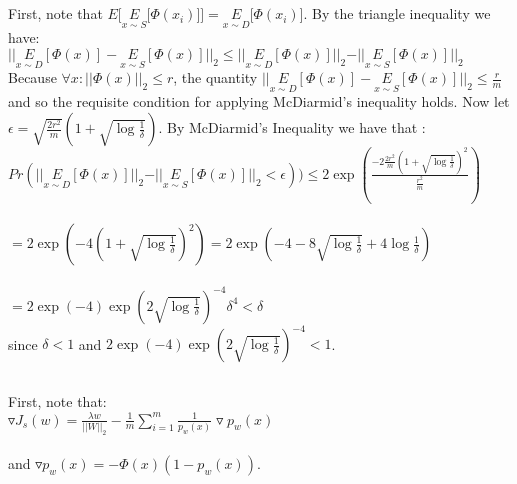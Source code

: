 \documentclass[]{article}
\begin{document}
\pagebreak

\section{}
\subsection{}

First, note that $E\lbrack \underset{x \sim S}{E}\lbrack \Phi(x_i) \rbrack \rbrack = \underset{x \sim D}{E}\lbrack \Phi(x_i) \rbrack$. By the triangle inequality we have:\\

$\vert \vert \underset{x \sim D}{E}[\Phi(x)] - \underset{x \sim S}{E}[\Phi(x)]\vert \vert_2 \le \vert \vert \underset{x \sim D}{E}[\Phi(x)]\vert \vert_2 - \vert \vert \underset{x \sim S}{E}[\Phi(x)]\vert \vert_2$\\

\noindent Because $\forall x: \vert \vert\Phi(x)\vert \vert_2 \le r$, the quantity $\vert \vert \underset{x \sim D}{E}[\Phi(x)] - \underset{x \sim S}{E}[\Phi(x)]\vert \vert_2 \le \frac{r}{m}$ and so the requisite condition for applying McDiarmid's inequality holds. Now let $\epsilon = \sqrt{\frac{2r^2}{m}}(1+\sqrt{\log \frac{1}{\delta}})$. By McDiarmid's Inequality we have that :\\

$Pr( \vert \vert \underset{x \sim D}{E}[\Phi(x)]\vert \vert_2 - \vert \vert \underset{x \sim S}{E}[\Phi(x)]\vert \vert_2 < \epsilon)) \le 2 \exp(\frac{- 2 \frac{2r^2}{m}(1+\sqrt{\log \frac{1}{\delta}})^2}{\frac{r^2}{m}})$\\\\

$= 2 \exp(- 4 (1+\sqrt{\log \frac{1}{\delta}})^2) = 2 \exp(- 4 - 8\sqrt{\log\frac{1}{\delta}} + 4\log\frac{1}{\delta})$\\\\

$= 2 \exp(-4)\exp(2\sqrt{\log\frac{1}{\delta}})^{-4}\delta^4 < \delta$\\

\noindent since $\delta < 1$ and $2 \exp(-4)\exp(2\sqrt{\log\frac{1}{\delta}})^{-4} < 1$.

\subsection{}

First, note that:\\
$\triangledown J_s(w) = \frac{\lambda w}{\vert \vert W \vert \vert_2} - \frac{1}{m}\sum_{i=1}^{m} \frac{1}{p_w(x)} \triangledown p_w(x)$\\\\
and $\triangledown p_w(x) = -\Phi(x)(1-p_w(x))$.
\end{document}
